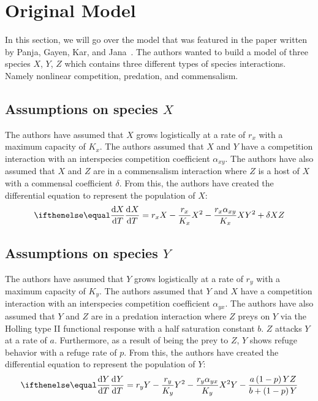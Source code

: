 \section{Original Model}\label{sec:original_model}
In this section, we will go over the model that was featured in the paper written by Panja, Gayen, Kar, and Jana~\cite{PANJA2022100153}. The authors wanted to build a model of three species $X$, $Y$, $Z$ which contains three different types of species interactions. Namely nonlinear competition, predation, and commensalism.

\subsection{Assumptions on species $X$}\label{subsec:assumptions_x}
The authors have assumed that $X$ grows logistically at a rate of $r_x$ with a maximum capacity of $K_x$. The authors assumed that $X$ and $Y$ have a competition interaction with an interspecies competition coefficient $\alpha_{xy}$. The authors have also assumed that $X$ and $Z$ are in a commensalism interaction where $Z$ is a host of $X$ with a commensal coefficient $\delta$. From this, the authors have created the differential equation to represent the population of $X$:
\begin{equation}
    \diff[]{X}{T} = r_xX-\frac{r_x}{K_x}X^2-\frac{r_x\alpha_{xy}}{K_x}XY^2+\delta XZ
    \label{eq:2.1}
\end{equation}

\subsection{Assumptions on species $Y$}\label{subsec:assumptions_y}
The authors have assumed that $Y$ grows logistically at a rate of $r_y$ with a maximum capacity of $K_y$. The authors assumed that $Y$ and $X$ have a competition interaction with an interspecies competition coefficient $\alpha_{yx}$. The authors have also assumed that $Y$ and $Z$ are in a predation interaction where $Z$ preys on $Y$ via the Holling type II functional response with a half saturation constant $b$. $Z$ attacks $Y$ at a rate of $a$. Furthermore, as a result of being the prey to $Z$, $Y$ shows refuge behavior with a refuge rate of $p$. From this, the authors have created the differential equation to represent the population of $Y$:
\begin{equation}
    \diff[]{Y}{T} = r_yY-\frac{r_y}{K_y}Y^2-\frac{r_y\alpha_{yx}}{K_y}X^2Y-\frac{a\left(1-p\right)YZ}{b+\left(1-p\right)Y}
    \label{eq:2.2}
\end{equation}

